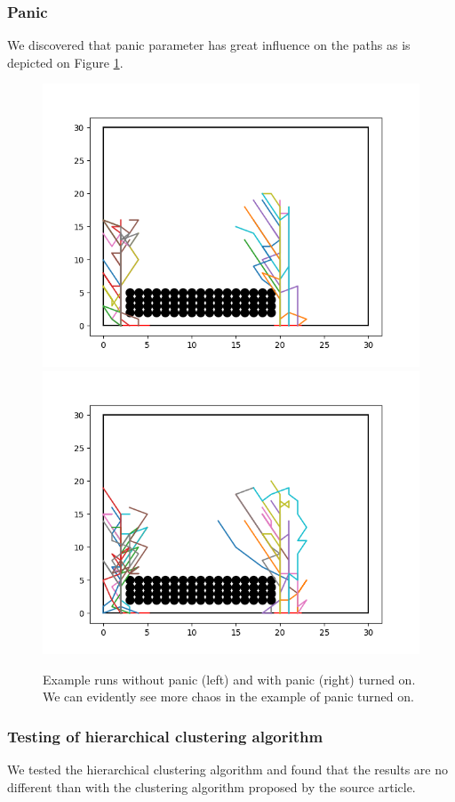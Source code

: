 \documentclass[9pt]{pnas-new}
\begin{document}
\subsubsection{Panic}
We discovered that panic parameter has great influence on the paths as is depicted on Figure \ref{fig:panic}.

\begin{figure}[h!]
    \centering
    \includegraphics[width=0.45\linewidth]{fig/path_plot_nopanic.png}
    \hfill
    \includegraphics[width=0.45\linewidth]{fig/path_plot_panic.png}
    \caption{Example runs without panic (left) and with panic (right) turned on. We can evidently see more chaos in the example of panic turned on.}
    \label{fig:panic}
\end{figure}

\subsubsection{Testing of hierarchical clustering algorithm}

We tested the hierarchical clustering algorithm and found that the results are no different than with the clustering algorithm proposed by the source article.
\end{document}
